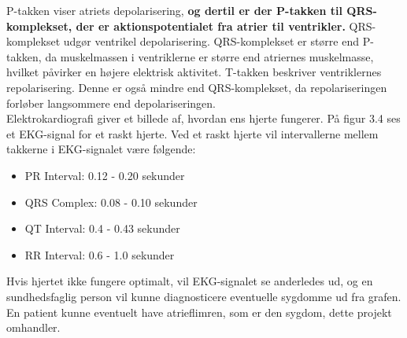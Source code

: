 P-takken viser atriets depolarisering, \textbf{og dertil er der P-takken til QRS-komplekset, der er aktionspotentialet fra atrier til ventrikler.} QRS-komplekset udgør ventrikel depolarisering. QRS-komplekset er større end P-takken, da muskelmassen i ventriklerne er større end atriernes muskelmasse, hvilket påvirker en højere elektrisk aktivitet. T-takken beskriver ventriklernes repolarisering. Denne er også mindre end QRS-komplekset, da repolariseringen forløber langsommere end depolariseringen.\\
Elektrokardiografi giver et billede af, hvordan ens hjerte fungerer. På figur 3.4 ses et EKG-signal for et raskt hjerte. Ved et raskt hjerte vil intervallerne mellem takkerne i EKG-signalet være følgende: 

\begin{itemize}
	\item PR Interval: 0.12 - 0.20 sekunder
	\item QRS Complex: 0.08 - 0.10 sekunder 
	\item QT Interval: 0.4 - 0.43 sekunder 
	\item RR Interval: 0.6 - 1.0 sekunder 
\end{itemize}

 Hvis hjertet ikke fungere optimalt, vil EKG-signalet se anderledes ud, og en sundhedsfaglig person vil kunne diagnosticere eventuelle sygdomme ud fra grafen.  En patient kunne eventuelt have atrieflimren, som er den sygdom, dette projekt omhandler.  


